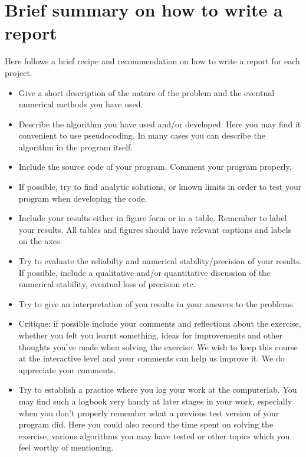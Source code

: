 \section*{Brief summary on how to write a report}

Here follows a brief recipe and recommendation on how to write a report for each
project.
\begin{itemize}
\item Give a short description of the nature of the problem and the eventual 
numerical methods you have used.
\item Describe the algorithm you have used and/or developed. Here you may find it convenient
to use pseudocoding. In many cases you can describe the algorithm
in the program itself.

\item Include the source code of your program. Comment your program properly.
\item If possible, try to find analytic solutions, or known limits
in order to test your program when developing the code.
\item Include your results either in figure form or in a table. Remember to
       label your results. All tables and figures should have relevant captions
       and labels on the axes.
\item Try to evaluate the reliabilty and numerical stability/precision
of your results. If possible, include a qualitative and/or quantitative
discussion of the numerical stability, eventual loss of precision etc. 

\item Try to give an interpretation of you results in your answers to 
the problems.
\item Critique: if possible include your comments and reflections about the 
exercise, whether you felt you learnt something, ideas for improvements and 
other thoughts you've made when solving the exercise.
We wish to keep this course at the interactive level and your comments can help
us improve it. We do appreciate your comments. 
\item Try to establish a practice where you log your work at the 
computerlab. You may find such a logbook very handy at later stages
in your work, especially when you don't properly remember 
what a previous test version 
of your program did. Here you could also record 
the time spent on solving the exercise, various algorithms you may have tested
or other topics which you feel worthy of mentioning.
\end{itemize}

